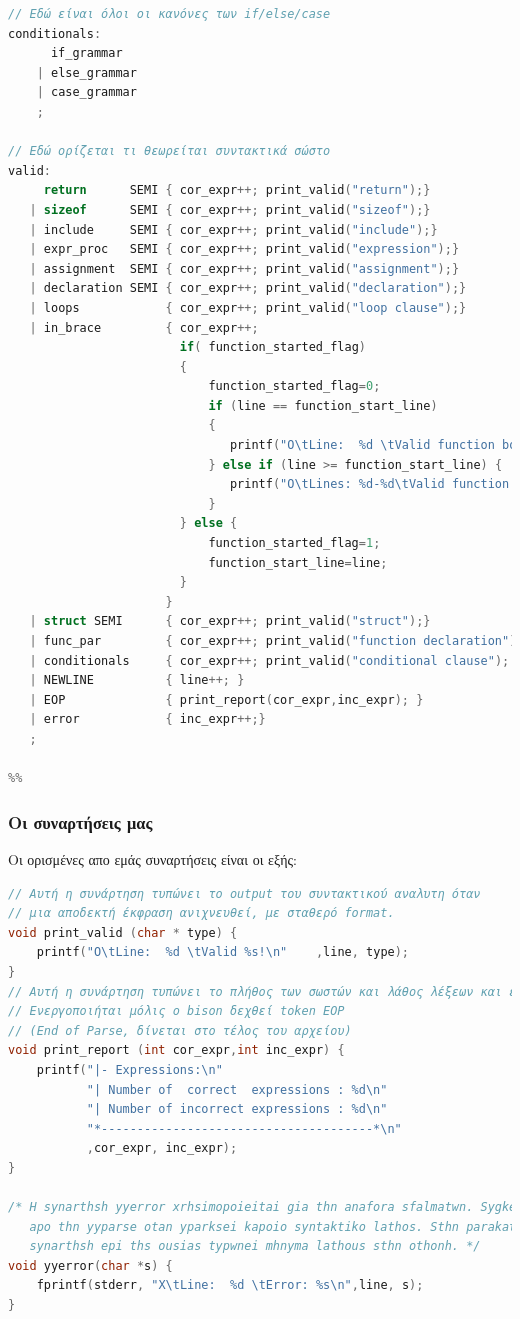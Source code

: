 \documentclass[14pt]{extarticle}
\begin{document}
\begin{lstlisting}[language=C]
// Εδώ είναι όλοι οι κανόνες των if/else/case
conditionals:
      if_grammar
    | else_grammar
    | case_grammar
    ;

// Εδώ ορίζεται τι θεωρείται συντακτικά σώστο
valid:
     return      SEMI { cor_expr++; print_valid("return");}
   | sizeof      SEMI { cor_expr++; print_valid("sizeof");}
   | include     SEMI { cor_expr++; print_valid("include");}
   | expr_proc   SEMI { cor_expr++; print_valid("expression");}
   | assignment  SEMI { cor_expr++; print_valid("assignment");}
   | declaration SEMI { cor_expr++; print_valid("declaration");}
   | loops            { cor_expr++; print_valid("loop clause");}
   | in_brace         { cor_expr++;
                        if( function_started_flag)
                        {
                            function_started_flag=0;
                            if (line == function_start_line)
                            {
                               printf("O\tLine:  %d \tValid function body!\n",function_start_line);
                            } else if (line >= function_start_line) {
                               printf("O\tLines: %d-%d\tValid function body!\n",function_start_line, line);
                            }
                        } else {
                            function_started_flag=1;
                            function_start_line=line;
                        }
                      }
   | struct SEMI      { cor_expr++; print_valid("struct");}
   | func_par         { cor_expr++; print_valid("function declaration");}
   | conditionals     { cor_expr++; print_valid("conditional clause");  }
   | NEWLINE          { line++; }
   | EOP              { print_report(cor_expr,inc_expr); }
   | error            { inc_expr++;}
   ;

%%
\end{lstlisting}

\subsubsection{Οι συναρτήσεις μας}
Οι ορισμένες απο εμάς συναρτήσεις είναι οι εξής:
\begin{lstlisting}[language=C]
// Αυτή η συνάρτηση τυπώνει το output του συντακτικού αναλυτη όταν
// μια αποδεκτή έκφραση ανιχνευθεί, με σταθερό format.
void print_valid (char * type) {
    printf("O\tLine:  %d \tValid %s!\n"    ,line, type);
}
// Αυτή η συνάρτηση τυπώνει το πλήθος των σωστών και λάθος λέξεων και εκφράσεων
// Ενεργοποιήται μόλις ο bison δεχθεί token EOP
// (End of Parse, δίνεται στο τέλος του αρχείου)
void print_report (int cor_expr,int inc_expr) {
    printf("|- Expressions:\n"
           "| Number of  correct  expressions : %d\n"
           "| Number of incorrect expressions : %d\n"
           "*--------------------------------------*\n"
           ,cor_expr, inc_expr);
}

/* H synarthsh yyerror xrhsimopoieitai gia thn anafora sfalmatwn. Sygkekrimena kaleitai
   apo thn yyparse otan yparksei kapoio syntaktiko lathos. Sthn parakatw periptwsh h
   synarthsh epi ths ousias typwnei mhnyma lathous sthn othonh. */
void yyerror(char *s) {
    fprintf(stderr, "X\tLine:  %d \tError: %s\n",line, s);
}
\end{lstlisting}
\end{document}
